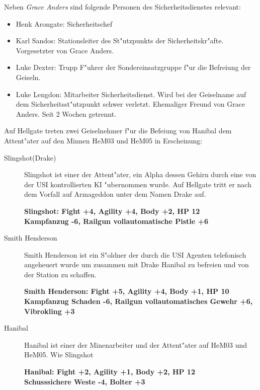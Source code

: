 
Neben \emph{Grace Anders} sind folgende Personen des Sicherheitsdienstes relevant:

\begin{itemize}
    \item Henk Arongate: Sicherheitschef    
    \item Karl Sandos: Stationsleiter des St"utzpunkts der Sicherheitskr"afte. Vorgesetzter von Grace Anders.
    \item Luke Dexter: Trupp F"uhrer der Sondereinsatzgruppe f"ur die Befreiung der Geiseln.
    \item Luke Lengdon: Mitarbeiter Sicherheitsdienst. Wird bei der Geiselname auf dem Sicherheitsst"utzpunkt schwer 
    verletzt. Ehemaliger Freund von Grace Anders. Seit 2 Wochen getrennt.
\end{itemize}


Auf Hellgate treten zwei Geiselnehmer f"ur die Befeiung von Hanibal dem Attent"ater auf den Minnen HeM03 und HeM05 in
Erscheinung:

\begin{description}
    \item[Slingshot(Drake)] Slingshot ist einer der Attent"ater, ein Alpha dessen Gehirn durch eine von der USI kontrollierten 
    KI "ubernommen wurde. Auf Hellgate tritt er nach dem Vorfall auf Armageddon unter dem Namen Drake auf.

    \textbf{Slingshot: Fight +4, Agility +4, Body +2, HP 12\\
    Kampfanzug -6, Railgun vollautomatische Pistle +6}

    \item[Smith Henderson] Smith Henderson ist ein S"oldner der durch die USI Agenten telefonisch angeheuert wurde um 
    zusammen mit Drake Hanibal zu befreien und von der Station zu schaffen.

    \textbf{Smith Henderson: Fight +5, Agility +4, Body +1, HP 10\\
    Kampfanzug Schaden -6, Railgun vollautomatisches Gewehr +6, Vibrokling +3}

    \item[Hanibal] Hanibal ist einer der Minenarbeiter und der Attent"ater auf HeM03 und HeM05. Wie Slingshot 

    \textbf{Hanibal: Fight +2, Agility +1, Body +2, HP 12\\
    Schusssichere Weste -4, Bolter +3}
\end{description}


